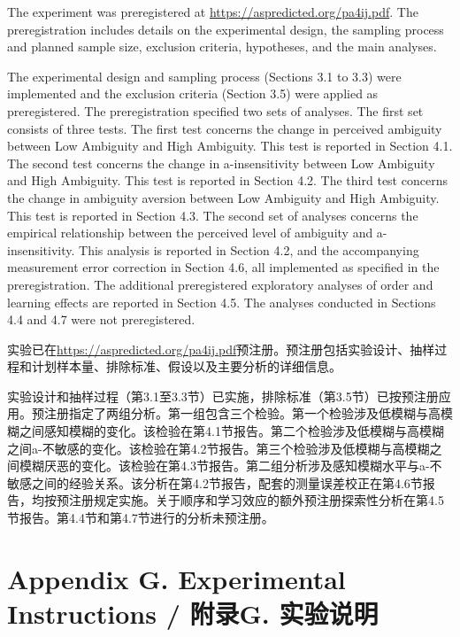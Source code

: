 \documentclass[12pt,a4paper]{article}
\newenvironment{original}
  {\par\medskip\noindent\color{black}\ignorespaces}
  {\par\medskip}
\newenvironment{translation}
  {\par\noindent\color{transblue}\ignorespaces}
  {\par\medskip\medskip}
\begin{document}
\begin{original}
The experiment was preregistered at \url{https://aspredicted.org/pa4ij.pdf}. The preregistration includes details on the experimental design, the sampling process and planned sample size, exclusion criteria, hypotheses, and the main analyses.

The experimental design and sampling process (Sections 3.1 to 3.3) were implemented and the exclusion criteria (Section 3.5) were applied as preregistered. The preregistration specified two sets of analyses. The first set consists of three tests. The first test concerns the change in perceived ambiguity between Low Ambiguity and High Ambiguity. This test is reported in Section 4.1. The second test concerns the change in a-insensitivity between Low Ambiguity and High Ambiguity. This test is reported in Section 4.2. The third test concerns the change in ambiguity aversion between Low Ambiguity and High Ambiguity. This test is reported in Section 4.3. The second set of analyses concerns the empirical relationship between the perceived level of ambiguity and a-insensitivity. This analysis is reported in Section 4.2, and the accompanying measurement error correction in Section 4.6, all implemented as specified in the preregistration. The additional preregistered exploratory analyses of order and learning effects are reported in Section 4.5. The analyses conducted in Sections 4.4 and 4.7 were not preregistered.
\end{original}

\begin{translation}
实验已在\url{https://aspredicted.org/pa4ij.pdf}预注册。预注册包括实验设计、抽样过程和计划样本量、排除标准、假设以及主要分析的详细信息。

实验设计和抽样过程（第3.1至3.3节）已实施，排除标准（第3.5节）已按预注册应用。预注册指定了两组分析。第一组包含三个检验。第一个检验涉及低模糊与高模糊之间感知模糊的变化。该检验在第4.1节报告。第二个检验涉及低模糊与高模糊之间a-不敏感的变化。该检验在第4.2节报告。第三个检验涉及低模糊与高模糊之间模糊厌恶的变化。该检验在第4.3节报告。第二组分析涉及感知模糊水平与a-不敏感之间的经验关系。该分析在第4.2节报告，配套的测量误差校正在第4.6节报告，均按预注册规定实施。关于顺序和学习效应的额外预注册探索性分析在第4.5节报告。第4.4节和第4.7节进行的分析未预注册。
\end{translation}

\newpage
\section*{Appendix G. Experimental Instructions / 附录G. 实验说明}
\end{document}
